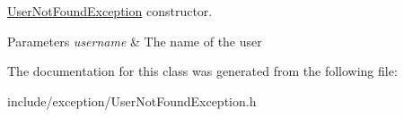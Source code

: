\hyperlink{class_f_t_p_1_1_user_not_found_exception}{User\-Not\-Found\-Exception} constructor. 


\begin{DoxyParams}{Parameters}
{\em username} & The name of the user \\
\hline
\end{DoxyParams}


The documentation for this class was generated from the following file\-:\begin{DoxyCompactItemize}
\item 
include/exception/User\-Not\-Found\-Exception.\-h\end{DoxyCompactItemize}
